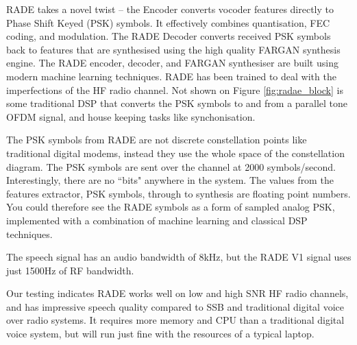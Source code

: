 \documentclass{article}
\begin{document}
RADE takes a novel twist – the Encoder converts vocoder features directly to Phase Shift Keyed (PSK) symbols. It effectively combines quantisation, FEC coding, and modulation.  The RADE Decoder converts received PSK symbols back to features that are synthesised using the high quality FARGAN synthesis engine. The RADE encoder, decoder, and FARGAN synthesiser are built using modern machine learning techniques.  RADE has been trained to deal with the imperfections of the HF radio channel. Not shown on Figure \ref{fig:radae_block} is some traditional DSP that converts the PSK symbols to and from a parallel tone OFDM signal, and house keeping tasks like synchonisation.

The PSK symbols from RADE are not discrete constellation points like traditional digital modems, instead they use the whole space of the constellation diagram.  The PSK symbols are sent over the channel at 2000 symbols/second.  Interestingly, there are no ``bits" anywhere in the system.  The values from the features extractor, PSK symbols, through to synthesis are floating point numbers. You could therefore see the RADE symbols as a form of sampled analog PSK, implemented with a combination of machine learning and classical DSP techniques.

The speech signal has an audio bandwidth of 8kHz, but the RADE V1 signal uses just 1500Hz of RF bandwidth.

Our testing indicates RADE works well on low and high SNR HF radio channels, and has impressive speech quality compared to SSB and traditional digital voice over radio systems. It requires more memory and CPU than a traditional digital voice system, but will run just fine with the resources of a typical laptop.
\end{document}
